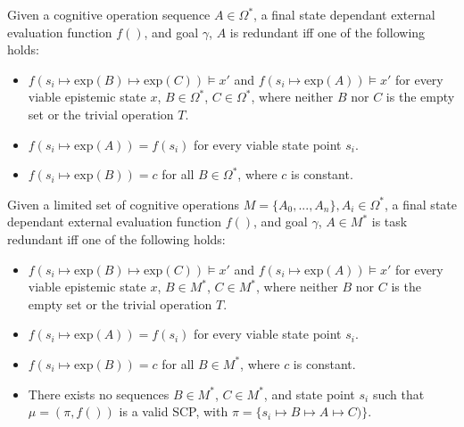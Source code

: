 \begin{definition} \label{lem:uniredundant}
Given a cognitive operation sequence $A \in \Omega^*$, a final state dependant external evaluation function $f()$, and goal $\gamma$, $A$ is redundant iff one of the following holds:
\begin{itemize}
\item $f(s_i \longmapsto \text{exp}(B) \longmapsto \text{exp}(C)) \models x'$ and $f(s_i \longmapsto \text{exp}(A)) \models x'$ for every viable epistemic state $x$, $B \in \Omega^*$, $C \in \Omega^*$, where neither $B$ nor $C$ is the empty set or the trivial operation $T$. 
\item $f(s_i \longmapsto \text{exp}(A)) = f(s_i)$ for every viable state point $s_i$.
\item $f(s_i \longmapsto \text{exp}(B))=c$ for all $B \in \Omega^*$, where $c$ is constant.
\end{itemize}
\end{definition}

\begin{definition} \label{lem:taskredundant}
Given a limited set of cognitive operations $M=\{A_0, ..., A_n\}, A_i \in \Omega^*$, a final state dependant external evaluation function  $f()$, and goal $\gamma$, $A \in M^*$ is task redundant iff one of the following holds:
\begin{itemize}
\item $f(s_i \longmapsto \text{exp}(B) \longmapsto \text{exp}(C)) \models x'$ and $f(s_i \longmapsto \text{exp}(A)) \models x'$ for every viable epistemic state $x$, $B \in M^*$, $C \in M^*$, where neither $B$ nor $C$ is the empty set or the trivial operation $T$. 
\item $f(s_i \longmapsto \text{exp}(A)) = f(s_i)$ for every viable state point $s_i$.
\item $f(s_i \longmapsto \text{exp}(B))=c$ for all $B \in M^*$, where $c$ is constant.
\item There exists no sequences $B \in M^*$, $C \in M^*$, and state point $s_i$ such that $\mu=(\pi,f())$ is a valid SCP, with $\pi=\{s_i \longmapsto B \longmapsto A \longmapsto C)\}$.
\end{itemize}
\end{definition}




